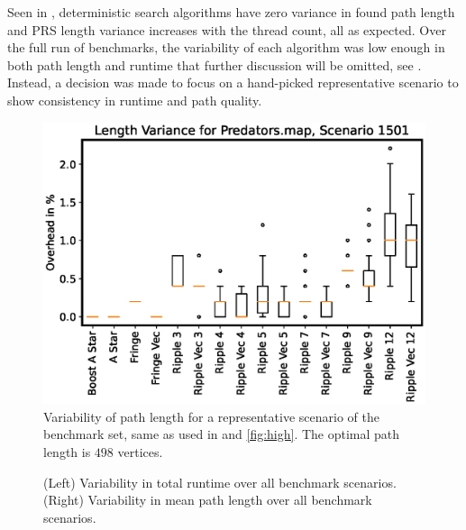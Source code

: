 \noindent Seen in , deterministic search algorithms have zero variance in found path length and PRS length variance increases with the thread count, all as expected.
Over the full run of benchmarks, the variability of each algorithm was low enough in both path length and runtime that further discussion will be omitted, see .
Instead, a decision was made to focus on a hand-picked representative scenario to show consistency in runtime and path quality. 

\begin{figure}[H]
    \centering
    \includegraphics[width=\linewidth]{img/scenario_cost.eps}
    \caption{Variability of path length for a representative scenario of the benchmark set, same as used in  and \ref{fig:high}. The optimal path length is $498$ vertices.}
    \label{fig:var-cost}
\end{figure}

\begin{figure}[h]
    \captionsetup[subfigure]{labelformat=empty}
 	\hfill
    \caption{(Left) Variability in total runtime over all benchmark scenarios. (Right) Variability in mean path length over all benchmark scenarios.}
    \label{fig:var-overall}
\end{figure}